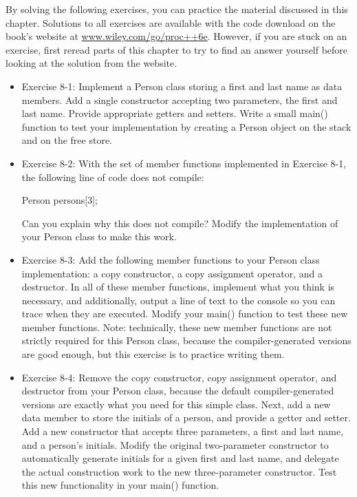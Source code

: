 By solving the following exercises, you can practice the material discussed in this chapter. Solutions to all exercises are available with the code download on the book’s website at \url{www.wiley.com/go/proc++6e}. However, if you are stuck on an exercise, first reread parts of this chapter to try to find an answer yourself before looking at the solution from the website.

\begin{itemize}
\item
Exercise 8-1: Implement a Person class storing a first and last name as data members. Add a single constructor accepting two parameters, the first and last name. Provide appropriate getters and setters. Write a small main() function to test your implementation by creating a Person object on the stack and on the free store.

\item
Exercise 8-2: With the set of member functions implemented in Exercise 8-1, the following line of code does not compile:

\begin{cpp}
Person persons[3];
\end{cpp}

Can you explain why this does not compile? Modify the implementation of your Person class to make this work.

\item
Exercise 8-3: Add the following member functions to your Person class implementation: a copy constructor, a copy assignment operator, and a destructor. In all of these member functions, implement what you think is necessary, and additionally, output a line of text to the console so you can trace when they are executed. Modify your main() function to test these new member functions. Note: technically, these new member functions are not strictly required for this Person class, because the compiler-generated versions are good enough, but this exercise is to practice writing them.

\item
Exercise 8-4: Remove the copy constructor, copy assignment operator, and destructor from your Person class, because the default compiler-generated versions are exactly what you need for this simple class. Next, add a new data member to store the initials of a person, and provide a getter and setter. Add a new constructor that accepts three parameters, a first and last name, and a person’s initials. Modify the original two-parameter constructor to automatically generate initials for a given first and last name, and delegate the actual construction work to the new three-parameter constructor. Test this new functionality in your main() function.
\end{itemize}